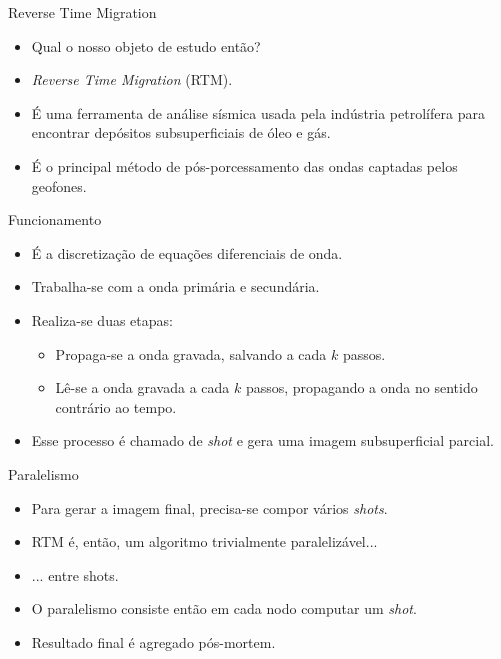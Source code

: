\documentclass{beamer}
\begin{document}
\begin{frame}{Reverse Time Migration}
  \begin{itemize}
  \item<+-> Qual o nosso objeto de estudo então?
  \item<+-> \textit{Reverse Time Migration} (RTM).
  \item<+-> É uma ferramenta de análise sísmica usada pela indústria petrolífera para encontrar depósitos subsuperficiais de óleo e gás.
  \item<+-> É o principal método de pós-porcessamento das ondas captadas pelos geofones.
  \end{itemize}
\end{frame}

\begin{frame}{Funcionamento}
  \begin{itemize}
  \item<+-> É a discretização de equações diferenciais de onda.
  \item<+-> Trabalha-se com a onda primária e secundária.
  \item<+-> Realiza-se duas etapas:
    \begin{itemize}
    \item<+-> Propaga-se a onda gravada, salvando a cada $k$ passos.
    \item<+-> Lê-se a onda gravada a cada $k$ passos, propagando a onda no sentido contrário ao tempo.
    \end{itemize}
  \item<+-> Esse processo é chamado de \emph{shot} e gera uma imagem subsuperficial parcial.
  \end{itemize}
\end{frame}

\begin{frame}{Paralelismo}
  \begin{itemize}
  \item<+-> Para gerar a imagem final, precisa-se compor vários \emph{shots}.
  \item<+-> RTM é, então, um algoritmo trivialmente paralelizável...
  \item<+-> ... entre shots.
  \item<+-> O paralelismo consiste então em cada nodo computar um \emph{shot}.
  \item<+-> Resultado final é agregado pós-mortem.
  \end{itemize}
\end{frame}
\end{document}
